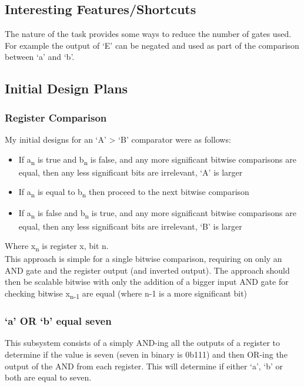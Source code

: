 \documentclass[11pt, article]{article}
\begin{document}
        \subsection{Interesting Features/Shortcuts}
            The nature of the task provides some ways to reduce the number of gates used. For example the output of `E' can be negated and used as part of the comparison between `a' and `b'.

        \subsection{Initial Design Plans}
            \subsubsection{Register Comparison}
                \label{sec:register}
                My initial designs for an `A' > `B' comparator were as follows:
                \begin{itemize}
                    \item If a\textsubscript{n} is true and b\textsubscript{n} is false, and any more significant bitwise comparisons are equal, then any less significant bits are irrelevant, `A' is larger
                    \item If a\textsubscript{n} is equal to b\textsubscript{n} then proceed to the next bitwise comparison
                    \item If a\textsubscript{n} is false and b\textsubscript{n} is true, and any more significant bitwise comparisons are equal, then any less significant bits are irrelevant, `B' is larger
                \end{itemize}
                Where x\textsubscript{n} is register x, bit n.\\
                This approach is simple for a single bitwise comparison, requiring on only an AND gate and the register output (and inverted output). The approach should then be scalable bitwise with only the addition of a bigger input AND gate for checking bitwise x\textsubscript{n-1} are equal (where n-1 is a more significant bit)

            \subsubsection{`a' OR `b' equal seven}
                \label{sec:equal}
                This subsystem consists of a simply AND-ing all the outputs of a register to determine if the value is seven (seven in binary is 0b111) and then OR-ing the output of the AND from each register. This will determine if either `a', `b' or both are equal to seven.
\end{document}
